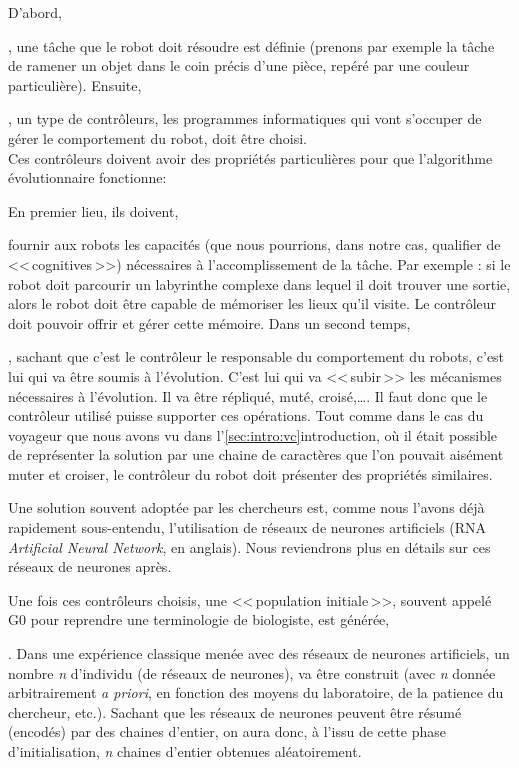 \begin{inparaenum}[(\itshape 1\upshape)]

D'abord, \item \label{it:deftache}, une tâche que le robot doit résoudre est définie (prenons par exemple la tâche de ramener un objet dans le coin précis d'une pièce, repéré par une couleur particulière). Ensuite, \item, \label{it:choixctrl} un type de contrôleurs, les programmes informatiques qui vont s'occuper de gérer le comportement du robot, doit être choisi.
\\ 
Ces contrôleurs doivent avoir des propriétés particulières pour que l'algorithme évolutionnaire fonctionne:

   \begin{inparaenum}
   En premier lieu, ils doivent, \item fournir aux robots les capacités (que nous pourrions, dans notre cas, qualifier de <<\,cognitives\,>>) nécessaires à l'accomplissement de la tâche. Par exemple : si le robot doit parcourir un labyrinthe complexe dans lequel il doit trouver une sortie, alors le robot doit être capable de mémoriser les lieux qu'il visite. Le contrôleur doit pouvoir offrir et gérer cette mémoire.
   Dans un second temps,\item, sachant que c'est le contrôleur le responsable du comportement du robots, c'est lui qui va être soumis à l'évolution. C'est lui qui va <<\,subir\,>> les mécanismes nécessaires à l'évolution. Il va être répliqué, muté, croisé,\ldots. Il faut donc que le contrôleur utilisé puisse supporter ces opérations. Tout comme dans le cas du voyageur que nous avons vu dans l'\ref{sec:intro:vc}introduction, où il était possible de représenter la solution par une chaine de caractères que l'on pouvait aisément muter et croiser, le contrôleur du robot doit présenter des propriétés similaires.
   \end{inparaenum}
   Une solution souvent adoptée par les chercheurs est, comme nous l'avons déjà rapidement sous-entendu, l'utilisation de réseaux de neurones artificiels (RNA \emph  {Artificial Neural Network},  en anglais). Nous reviendrons plus en détails sur ces réseaux de neurones après. %

  Une fois ces contrôleurs choisis,  une <<\,population initiale\,>>, souvent appelé G0 pour reprendre une terminologie de biologiste, est générée, \item. Dans une expérience classique menée avec des réseaux de neurones artificiels, un nombre \emph{n} d'individu (de réseaux de neurones), va être construit (avec \emph{n} donnée arbitrairement \emph{a priori}, en fonction des moyens du laboratoire, de la patience du chercheur, etc.). Sachant que les réseaux de neurones peuvent être résumé (encodés) par des chaines d'entier, on aura donc, à l'issu de cette phase d'initialisation, \emph{n} chaines d'entier obtenues aléatoirement. \label{it:init}


\end{inparaenum}
